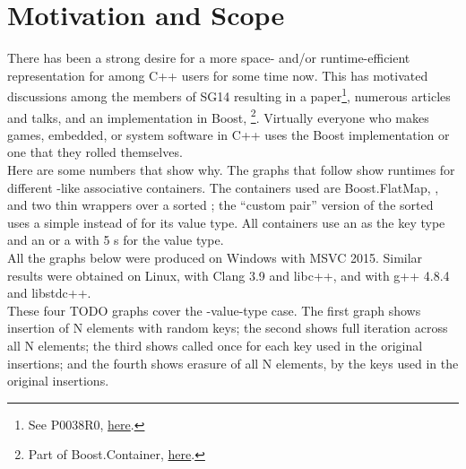 \section{Motivation and Scope}

There has been a strong desire for a more space- and/or runtime-efficient
representation for  among C++ users for some time now.  This has
motivated discussions among the members of SG14 resulting in a
paper\footnote{See P0038R0,
  \href{http://www.open-std.org/jtc1/sc22/wg21/docs/papers/2015/p0038r0.html}{here}.},
numerous articles and talks, and an implementation in Boost,
\footnote{Part of Boost.Container,
  \href{http://www.boost.org/doc/libs/1_61_0/doc/html/container.html}{here}.}.
Virtually everyone who makes games, embedded, or system software in C++ uses
the Boost implementation or one that they rolled themselves.\\

Here are some numbers that show why.  The graphs that follow show runtimes for
different -like associative containers.  The containers used are
Boost.FlatMap, , and two thin wrappers over a sorted ;
the ``custom pair'' version of the sorted  uses a simple
 instead of  for its value type.  All containers use
an  as the key type and an  or a  with 5
s for the value type.\\

All the graphs below were produced on Windows with MSVC 2015.  Similar results
were obtained on Linux, with Clang 3.9 and libc++, and with g++ 4.8.4 and
libstdc++.\\

These four TODO graphs cover the -value-type case.  The first graph
shows insertion of N elements with random keys; the second shows full
iteration across all N elements; the third shows  called once
for each key used in the original insertions; and the fourth shows erasure of
all N elements, by the keys used in the original insertions.

